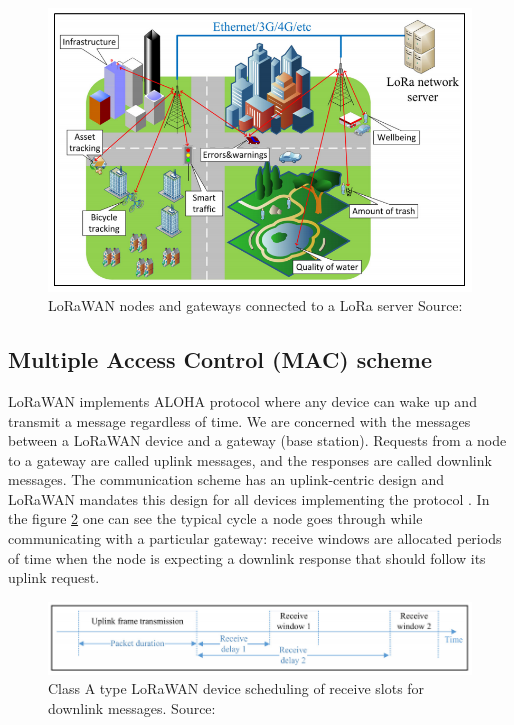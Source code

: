 \begin{figure}[h!]
  \centering
  \includegraphics[scale=0.4]{figures/start-topology.PNG}
  \caption{LoRaWAN nodes and gateways connected to a LoRa server Source: \cite{doppler}}
  \label{fig:star}
\end{figure}

\subsection{Multiple Access Control (MAC) scheme}

LoRaWAN implements ALOHA protocol where any 
device can wake up and transmit a message regardless of time. We are concerned with the messages between a LoRaWAN device and a gateway (base station). Requests from a node to a gateway are called uplink messages, and the responses are called downlink messages.  
The communication scheme has an uplink-centric design and 
LoRaWAN mandates this design for all devices implementing the protocol \cite{simulator}. In the figure \ref{fig:class A} one can see the typical cycle a node goes through while communicating with a particular gateway: receive windows are allocated periods of time when the node is expecting 
a downlink response that should follow its uplink request.

\begin{figure}[h!]
  \centering
  \includegraphics[scale=0.5]{figures/class A.PNG}
  \caption{Class A type LoRaWAN device scheduling of receive slots for downlink messages. Source: \cite{doppler}}
  \label{fig:class A}
\end{figure}


